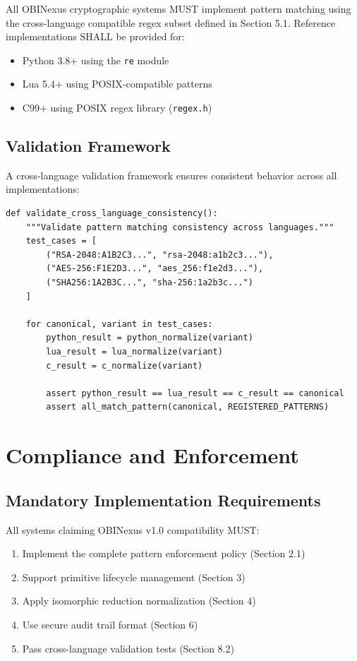 \documentclass[11pt,a4paper]{article}
\begin{document}
All OBINexus cryptographic systems MUST implement pattern matching using the cross-language compatible regex subset defined in Section 5.1. Reference implementations SHALL be provided for:

\begin{itemize}
    \item Python 3.8+ using the \texttt{re} module
    \item Lua 5.4+ using POSIX-compatible patterns  
    \item C99+ using POSIX regex library (\texttt{regex.h})
\end{itemize}

\subsection{Validation Framework}

A cross-language validation framework ensures consistent behavior across all implementations:

\begin{lstlisting}[caption=Cross-Language Validation Test]
def validate_cross_language_consistency():
    """Validate pattern matching consistency across languages."""
    test_cases = [
        ("RSA-2048:A1B2C3...", "rsa-2048:a1b2c3..."),
        ("AES-256:F1E2D3...", "aes_256:f1e2d3..."),
        ("SHA256:1A2B3C...", "sha-256:1a2b3c...")
    ]
    
    for canonical, variant in test_cases:
        python_result = python_normalize(variant)
        lua_result = lua_normalize(variant) 
        c_result = c_normalize(variant)
        
        assert python_result == lua_result == c_result == canonical
        assert all_match_pattern(canonical, REGISTERED_PATTERNS)
\end{lstlisting}

\section{Compliance and Enforcement}

\subsection{Mandatory Implementation Requirements}

All systems claiming OBINexus v1.0 compatibility MUST:

\begin{enumerate}
    \item Implement the complete pattern enforcement policy (Section 2.1)
    \item Support primitive lifecycle management (Section 3)
    \item Apply isomorphic reduction normalization (Section 4)
    \item Use secure audit trail format (Section 6)
    \item Pass cross-language validation tests (Section 8.2)
\end{enumerate}
\end{document}
